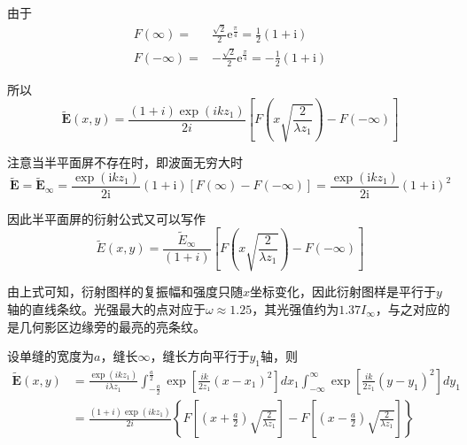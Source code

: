 \documentclass[UTF8]{ctexart}
\begin{document}
\noindent 由于
\begin{equation}
	\begin{aligned}
F(\infty)=&\frac{\sqrt{2}}{2} \mathrm{e}^{\frac{\pi}{4}}=\frac{1}{2}(1+\mathrm{i}) 
\\ 
F(-\infty)=&-\frac{\sqrt{2}}{2} \mathrm{e}^{\frac{\pi}{4}}=-\frac{1}{2}(1+\mathrm{i})
	\end{aligned}
\end{equation}

\noindent 所以
\begin{equation}
\tilde{\boldsymbol{E}}(x, y)=\frac{(1+i) \exp \left(i k z_{1}\right)}{2 i}\left[F\left(x \sqrt{\frac{2}{\lambda z_{1}}}\right)-F(-\infty)\right]
\end{equation}

	注意当半平面屏不存在时，即波面无穷大时
	\begin{equation}
	\tilde{\boldsymbol{E}}=\tilde{\boldsymbol{E}}_{\infty}=\frac{\exp \left(\mathrm{i} k z_{1}\right)}{2 \mathrm{i}}(1+\mathrm{i})[F(\infty)-F(-\infty)]=\frac{\exp \left(\mathrm{i} k z_{1}\right)}{2 \mathrm{i}}(1+\mathrm{i})^{2}
	\end{equation}
	
	因此半平面屏的衍射公式又可以写作
	\begin{equation}
	\tilde{E}(x, y)=\frac{\tilde{E}_{\infty}}{(1+i)}\left[F\left(x \sqrt{\frac{2}{\lambda z_{1}}}\right)-F(-\infty)\right]
	\end{equation}
	
\noindent 由上式可知，衍射图样的复振幅和强度只随$ x $坐标变化，因此衍射图样是平行于$ y $轴的直线条纹。光强最大的点对应于$ \omega \approx 1.25 $，其光强值约为$ 1.37 I_{\infty} $，与之对应的是几何影区边缘旁的最亮的亮条纹。

	设单缝的宽度为$ a $，缝长$ \infty $，缝长方向平行于$ y_{1} $轴，则
	\begin{equation}
	\begin{aligned}
		\tilde{\boldsymbol{E}}(x, y)&=\frac{\exp \left(i k z_{1}\right)}{i \lambda z_{1}} \int_{-\frac{a}{2}}^{\frac{a}{2}} \exp \left[\frac{i k}{2 z_{1}}\left(x-x_{1}\right)^{2}\right] d x_{1} \int_{-\infty}^{\infty} \exp \left[\frac{i k}{2 z_{1}}\left(y-y_{1}\right)^{2}\right] d y_{1}
		\\
		&=\frac{(1+i) \exp \left(i k z_{1}\right)}{2 i}\left\{F\left[\left(x+\frac{a}{2}\right) \sqrt{\frac{2}{\lambda z_{1}}}\right]-F\left[\left(x-\frac{a}{2}\right) \sqrt{\frac{2}{\lambda z_{1}}}\right]\right\}
	\end{aligned}
	\end{equation}
	
\end{document}
